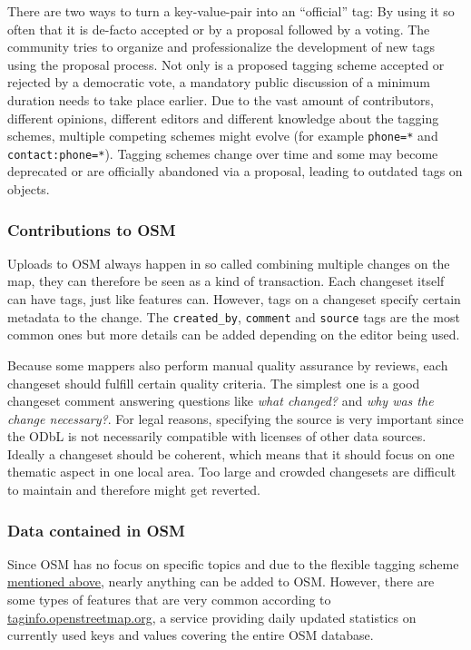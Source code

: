 			There are two ways to turn a key-value-pair into an \enquote{official} tag:
			By using it so often that it is de-facto accepted or by a proposal followed by a voting.
			The community tries to organize and professionalize the development of new tags using the proposal process.
			Not only is a proposed tagging scheme accepted or rejected by a democratic vote, a mandatory public discussion of a minimum duration needs to take place earlier.
			Due to the vast amount of contributors, different opinions, different editors and different knowledge about the tagging schemes, multiple competing schemes might evolve (for example \texttt{phone=*} and \texttt{contact:phone=*}).
			Tagging schemes change over time and some may become deprecated or are officially abandoned via a proposal, leading to outdated tags on objects.
			
		\subsubsection{Contributions to OSM}
		
			Uploads to OSM always happen in so called  combining multiple changes on the map\cite{osm-wiki-changeset}, they can therefore be seen as a kind of transaction.
			Each changeset itself can have tags, just like features can.
			However, tags on a changeset specify certain metadata to the change.
			The \texttt{created\_by}, \texttt{comment} and \texttt{source} tags are the most common ones but more details can be added depending on the editor being used.
			
			Because some mappers also perform manual quality assurance by reviews, each changeset should fulfill certain quality criteria.
			The simplest one is a good changeset comment answering questions like \textit{what changed?} and \textit{why was the change necessary?}.
			For legal reasons, specifying the source is very important since the ODbL is not necessarily compatible with licenses of other data sources.
			Ideally a changeset should be coherent, which means that it should focus on one thematic aspect in one local area.
			Too large and crowded changesets are difficult to maintain and therefore might get reverted.
			
		\subsubsection{Data contained in OSM}
		
			Since OSM has no focus on specific topics and due to the flexible tagging scheme \hyperref[subsubsec:osm-attributes]{mentioned above}, nearly anything can be added to OSM.
			However, there are some types of features that are very common according to \href{https://taginfo.openstreetmap.org/keys}{taginfo.openstreetmap.org}, a service providing daily updated statistics on currently used keys and values covering the entire OSM database\cite{taginfo-keys}.
			
